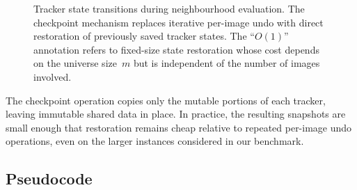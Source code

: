 \documentclass[11pt,a4paper]{article}
\begin{document}
\begin{figure}[t]
\centering
\small
\setlength{\fboxsep}{6pt}
\caption{Tracker state transitions during neighbourhood evaluation.  The
  checkpoint mechanism replaces iterative per-image undo with direct
  restoration of previously saved tracker states.  The ``$O(1)$''
  annotation refers to fixed-size state restoration whose cost depends
  on the universe size~$m$ but is independent of the number of images
  involved.}
\label{fig:checkpoint}
\end{figure}

The checkpoint operation copies only the mutable portions of each
tracker, leaving immutable shared data in place.  In practice, the
resulting snapshots are small enough that restoration remains cheap
relative to repeated per-image undo operations, even on the larger
instances considered in our benchmark.

\subsection{Pseudocode}
\end{document}
